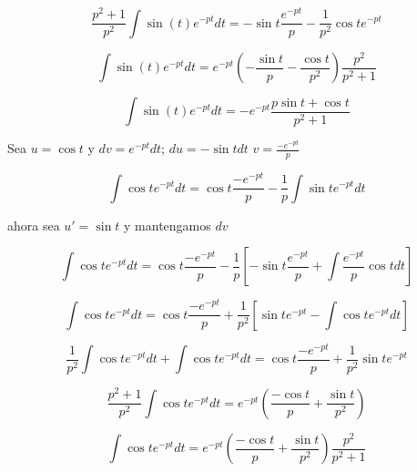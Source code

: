 \documentclass[12pt,a4paper]{article}
\begin{document}
\begin{enumerate}
    \begin{equation*}
        \frac{p^2+1}{p^2}\int \sin(t)e^{-pt}dt= -\sin{t} \frac{e^{-pt}}{p} -\frac{1}{p^2}\cos{t}e^{-pt}
    \end{equation*}
    
    \begin{equation*}
        \int \sin(t)e^{-pt}dt= e^{-pt}(-\frac{\sin{t}}{p} -\frac{\cos{t}}{p^2}) \frac{p^2}{p^2 +1}
    \end{equation*}
    
    \begin{equation*}
        \int \sin(t)e^{-pt}dt= -e^{-pt}\frac{p\sin{t}+\cos{t}}{p^2+1}
    \end{equation*}
    
    Sea $u=\cos{t}$ y $dv=e^{-pt}dt$; $du=-\sin{t}dt$ $v=\frac{-e^{-pt}}{p}$
    
    \begin{equation*}
        \int \cos{t}e^{-pt}dt= \cos{t}\frac{-e^{-pt}}{p} - \frac{1}{p} \int \sin{t}e^{-pt} dt 
    \end{equation*}
    
    ahora sea $u'=\sin{t}$ y mantengamos $dv$
    
    \begin{equation*}
        \int \cos{t}e^{-pt}dt= \cos{t}\frac{-e^{-pt}}{p} - \frac{1}{p} \left[  -\sin{t} \frac{e^{-pt}}{p} + \int \frac{e^{-pt}}{p} \cos{t} dt \right]
    \end{equation*}
    
    \begin{equation*}
        \int \cos{t}e^{-pt}dt= \cos{t}\frac{-e^{-pt}}{p} + \frac{1}{p^2} \left[\sin{t}e^{-pt} - \int \cos{t} e^{-pt}  dt \right]
    \end{equation*}
    
    \begin{equation*}
        \frac{1}{p^2}\int \cos{t} e^{-pt}  dt +\int \cos{t}e^{-pt}dt= \cos{t}\frac{-e^{-pt}}{p} + \frac{1}{p^2}\sin{t}e^{-pt} 
    \end{equation*}
    
    \begin{equation*}
        \frac{p^2+1}{p^2}\int \cos{t}e^{-pt}dt=e^{-pt}( \frac{-\cos{t}}{p} + \frac{\sin{t}}{p^2} )
    \end{equation*}
    
    \begin{equation*}
        \int \cos{t}e^{-pt}dt=e^{-pt}( \frac{-\cos{t}}{p} + \frac{\sin{t}}{p^2} )\frac{p^2}{p^2+1}
    \end{equation*}
    

\end{enumerate}
\end{document}
